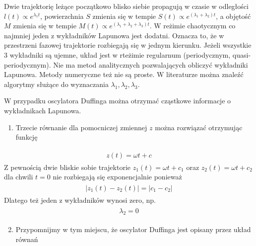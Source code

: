 \documentclass[a4paper,12pt,polish]{sphinxmanual}
\begin{document}
Dwie trajektorię leżące początkowo blisko siebie propagują w czasie w odległości   $l(t)   \propto e^{\lambda_1 t}$, powierzchnia  $S$ zmienia się w tempie $S(t)  \propto e^{(\lambda_1 + \lambda_2) t}$, a objętość  $M$ zmienia się w tempie $M(t)  \propto e^{(\lambda_1 + \lambda_2 + \lambda_3) t}$. W reżimie chaotycznym co najmniej jeden z wykładników Lapunowa jest dodatni. Oznacza to, że w przestrzeni fazowej trajektorie rozbiegają się w jednym kierunku. Jeżeli wszystkie 3 wykładniki są ujemne, układ jest w rteżimie regularnum (periodycznym, quasi-periodycznym). Nie ma metod analitycznych pozwalających obliczyć wykładniki Lapunowa. Metody numeryczne też nie są proste. W literaturze można znaleźć algorytmy służące do wyznaczania $\lambda_1, \lambda_2, \lambda_3$.

W przypadku oscylatora Duffinga można otrzymać cząstkowe  informacje o wykładnikach Lapunowa.
\begin{enumerate}
\item {} 
Trzecie równanie dla pomocniczej zmiennej $z$ można rozwiązać otrzymując funkcję

\end{enumerate}
\label{ch2/chII012:equation-eqn8}\begin{gather}
\begin{split}z(t) = \omega t + c\end{split}\label{ch2/chII012-eqn8}
\end{gather}
Z pewnością dwie bliskie sobie trajektorie $z_1(t) = \omega t+c_1$ oraz $z_2(t) = \omega t + c_2$ dla chwili   $t=0$ nie rozbiegają się exponencjalnie ponieważ
\label{ch2/chII012:equation-eqn9}\begin{gather}
\begin{split}|z_1(t) - z_2(t)| = |c_1 -c_2|\end{split}\label{ch2/chII012-eqn9}
\end{gather}
Dlatego też jeden z wykładników wynosi zero, np.
\label{ch2/chII012:equation-eqn10}\begin{gather}
\begin{split}\lambda_2 = 0\end{split}\label{ch2/chII012-eqn10}
\end{gather}\begin{enumerate}
\setcounter{enumi}{1}
\item {} 
Przypomnijmy w tym miejscu, że oscylator Duffinga jest opisany przez układ równań

\end{enumerate}
\end{document}
